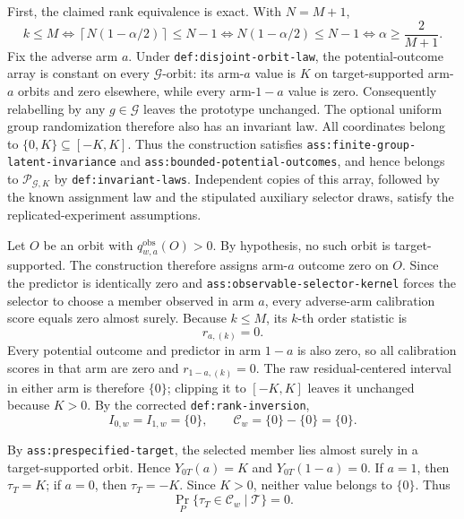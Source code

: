 First, the claimed rank equivalence is exact. With \(N=M+1\),
\[k\le M\iff \left\lceil N(1-\alpha/2)\right\rceil\le N-1\iff N(1-\alpha/2)\le N-1\iff \alpha\ge\frac{2}{M+1}.\]
Fix the adverse arm \(a\). Under \texttt{def:disjoint-orbit-law}, the potential-outcome array is constant on every \(\mathcal G\)-orbit: its arm-\(a\) value is \(K\) on target-supported arm-\(a\) orbits and zero elsewhere, while every arm-\(1-a\) value is zero. Consequently relabelling by any \(g\in\mathcal G\) leaves the prototype unchanged. The optional uniform group randomization therefore also has an invariant law. All coordinates belong to \(\{0,K\}\subseteq[-K,K]\). Thus the construction satisfies \texttt{ass:finite-group-latent-invariance} and \texttt{ass:bounded-potential-outcomes}, and hence belongs to \(\mathcal P_{\mathcal G,K}\) by \texttt{def:invariant-laws}. Independent copies of this array, followed by the known assignment law and the stipulated auxiliary selector draws, satisfy the replicated-experiment assumptions.

Let \(O\) be an orbit with \(q^{\mathrm{obs}}_{w,a}(O)>0\). By hypothesis, no such orbit is target-supported. The construction therefore assigns arm-\(a\) outcome zero on \(O\). Since the predictor is identically zero and \texttt{ass:observable-selector-kernel} forces the selector to choose a member observed in arm \(a\), every adverse-arm calibration score equals zero almost surely. Because \(k\le M\), its \(k\)-th order statistic is
\[r_{a,(k)}=0.\]
Every potential outcome and predictor in arm \(1-a\) is also zero, so all calibration scores in that arm are zero and \(r_{1-a,(k)}=0\). The raw residual-centered interval in either arm is therefore \(\{0\}\); clipping it to \([-K,K]\) leaves it unchanged because \(K>0\). By the corrected \texttt{def:rank-inversion},
\[I_{0,w}=I_{1,w}=\{0\},\qquad \mathcal C_w=\{0\}-\{0\}=\{0\}.\]

By \texttt{ass:prespecified-target}, the selected member lies almost surely in a target-supported orbit. Hence \(Y_{0T}(a)=K\) and \(Y_{0T}(1-a)=0\). If \(a=1\), then \(\tau_T=K\); if \(a=0\), then \(\tau_T=-K\). Since \(K>0\), neither value belongs to \(\{0\}\). Thus
\[\Pr_P\{\tau_T\in\mathcal C_w\mid\mathcal T\}=0.\]